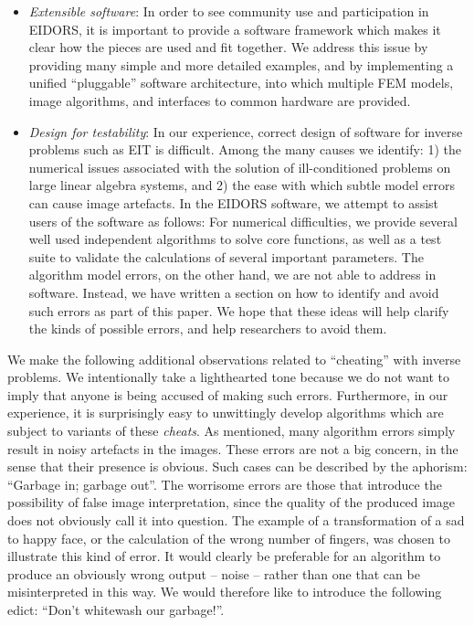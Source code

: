 \documentclass[12pt]{iopart}
\begin{document}
\begin{itemize}

  \item {\em Extensible software}:
  In order to see community use and participation
  in EIDORS, it is important to provide a 
  software framework which makes it clear how
  the pieces are used and fit together.
  We address this issue by providing many simple
  and more detailed examples, and by implementing
  a unified ``pluggable'' software architecture,
  into which multiple FEM models, image algorithms, and
  interfaces to common hardware are provided.

  \item {\em Design for testability}:
  In our experience, correct design of software for
  inverse problems such as EIT is difficult. Among the
  many causes we identify: 1) the numerical issues associated
  with the solution of ill-conditioned problems on
  large linear algebra systems, and 2) the ease with which
  subtle model errors can cause image artefacts.
  In the EIDORS software, we attempt to assist 
  users of the software as follows:
  For numerical difficulties, we provide several well used independent
  algorithms to solve core functions, as well as a test suite
  to validate the calculations of several important parameters.
  The algorithm model errors, on the other
  hand, we are not able to address in software. Instead, we
  have written a section on how to identify and avoid such
  errors as part of this paper.
  We hope that these ideas will help clarify the kinds of
  possible errors, and help researchers to avoid them.

\end{itemize}

We make the following additional observations related to 
``cheating'' with inverse problems.
We intentionally take a
lighthearted tone because we do not want to
imply that anyone is being accused of making such errors.
Furthermore, in our experience, it 
is surprisingly easy to unwittingly develop
algorithms which are subject to variants of these {\em cheats}.
As mentioned, many algorithm errors simply result in 
noisy artefacts in the images. These errors are not a big
concern, in the sense that their presence is obvious.
Such cases can be described by the aphorism:
``Garbage in; garbage out''.
The worrisome errors are those that introduce the possibility
of false image interpretation, since the quality of the
produced image does not obviously call it into question.
The example of a transformation of a sad to happy face,
or the calculation of the wrong number of fingers, 
was chosen to illustrate this kind of error. It would
clearly be preferable for an algorithm to produce an
obviously wrong output -- noise -- rather than one
that can be misinterpreted in this way. We would therefore like
to introduce the following edict: 
``Don't whitewash our garbage!''.
\end{document}
